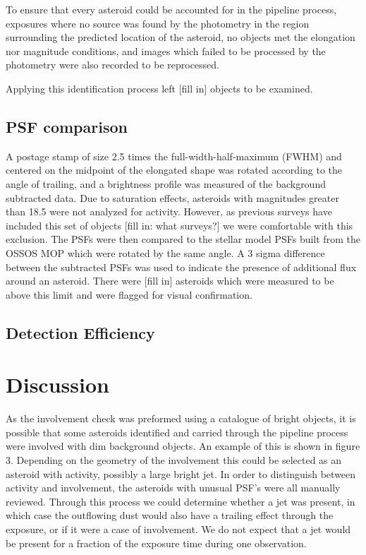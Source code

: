\documentclass[iop,apj]{emulateapj}
\begin{document}
To ensure that every asteroid could be accounted for in the pipeline process, exposures where no source was found by the photometry in the region surrounding the predicted location of the asteroid, no objects met the elongation nor magnitude conditions, and images which failed to be processed by the photometry were also recorded to be reprocessed.

Applying this identification process left [fill in] objects to be examined.


\subsection{PSF comparison}

A postage stamp of size 2.5 times the full-width-half-maximum (FWHM) and centered on the midpoint of the elongated shape was rotated according to the angle of trailing, and a brightness profile was measured of the background subtracted data. Due to saturation effects, asteroids with magnitudes greater than 18.5 were not analyzed for activity. However, as previous surveys have included this set of objects \cite{} [fill in: what surveys?] we were comfortable with this exclusion. The PSFs were then compared to the stellar model PSFs built from the OSSOS MOP \citep{ossos} which were rotated by the same angle. A 3 sigma difference between the subtracted PSFs was used to indicate the presence of additional flux around an asteroid. There were [fill in] asteroids which were measured to be above this limit and were flagged for visual confirmation. 

\subsection{Detection Efficiency}


\section{Discussion}

As the involvement check was preformed using a catalogue of bright objects, it is possible that some asteroids identified and carried through the pipeline process were involved with dim background objects. An example of this is shown in figure 3. Depending on the geometry of the involvement this could be selected as an asteroid with activity, possibly a large bright jet. In order to distinguish between activity and involvement, the asteroids with unusual PSF's were all manually reviewed. Through this process we could determine whether a jet was present, in which case the outflowing dust would also have a trailing effect through the exposure, or if it were a case of involvement. We do not expect that a jet would be present for a fraction of the exposure time during one observation. 
\end{document}
